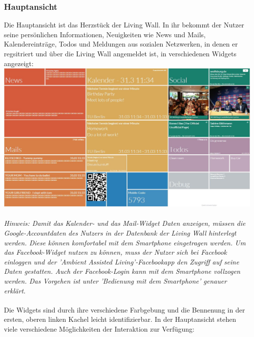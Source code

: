 \documentclass[10pt,a4paper]{report}
\begin{document}
		\subsubsection{Hauptansicht}
		Die Hauptansicht ist das Herzstück der Living Wall. In ihr bekommt der Nutzer seine persönlichen Informationen, Neuigkeiten wie News und Mails, Kalendereinträge, Todos und Meldungen aus sozialen Netzwerken, in denen er regsitriert und über die Living Wall angemeldet ist, in verschiedenen Widgets angezeigt:\\
		\includegraphics[scale=0.31]{Main}\\ \\
		\textit{Hinweis: Damit das Kalender- und das Mail-Widget Daten anzeigen, müssen die Google-Accountdaten des Nutzers in der Datenbank der Living Wall hinterlegt werden. Diese können komfortabel mit dem Smartphone eingetragen werden. Um das Facebook-Widget nutzen zu können, muss der Nutzer sich bei Facebook einloggen und der 'Ambient Assisted Living'-Facebookapp den Zugriff auf seine Daten gestatten. Auch der Facebook-Login kann mit dem Smartphone vollzogen werden. Das Vorgehen ist unter 'Bedienung mit dem Smartphone' genauer erklärt.}\\ \\
		Die Widgets sind durch ihre verschiedene Farbgebung und die Bennenung in der ersten, oberen linken Kachel leicht identifizierbar. In der Hauptansicht stehen viele verschiedene Möglichkeiten der Interaktion zur Verfügung:
\end{document}
